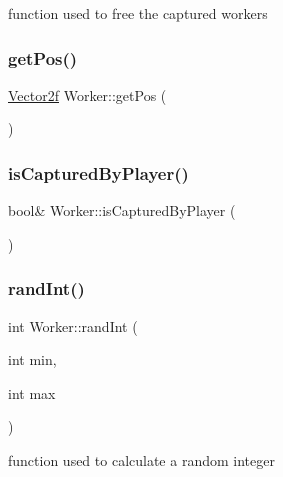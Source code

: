 function used to free the captured workers \mbox{\label{class_worker_a03c37b6ee9d3b5160a91f6f614b90b06}} 
\subsubsection{\texorpdfstring{getPos()}{getPos()}}
{\footnotesize\ttfamily \mbox{\hyperlink{class_vector2f}{Vector2f}} Worker\+::get\+Pos (\begin{DoxyParamCaption}{ }\end{DoxyParamCaption})\hspace{0.3cm}{\ttfamily [inline]}}

\mbox{\label{class_worker_a86655858aff676a8158887207b2e810c}} 
\subsubsection{\texorpdfstring{isCapturedByPlayer()}{isCapturedByPlayer()}}
{\footnotesize\ttfamily bool\& Worker\+::is\+Captured\+By\+Player (\begin{DoxyParamCaption}{ }\end{DoxyParamCaption})\hspace{0.3cm}{\ttfamily [inline]}}

\mbox{\label{class_worker_aaaa7317cbc70e298aa48b8fc9dc2e1b1}} 
\subsubsection{\texorpdfstring{randInt()}{randInt()}}
{\footnotesize\ttfamily int Worker\+::rand\+Int (\begin{DoxyParamCaption}\item[{int}]{min,  }\item[{int}]{max }\end{DoxyParamCaption})}

function used to calculate a random integer \mbox{\label{class_worker_a36782d25fae56d7bfcdc9c5233573a54}} 
